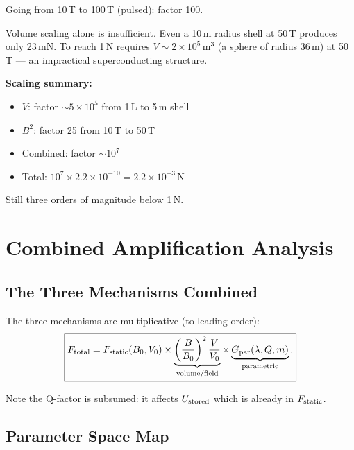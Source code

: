 \documentclass[11pt]{article}
\begin{document}
Going from 10\,T to 100\,T (pulsed): factor 100.

\begin{tcolorbox}[colback=blue!5!white, colframe=blue!50!black,
  title=Volume Scaling Verdict]
Volume scaling alone is insufficient. Even a 10\,m radius shell at 50\,T
produces only 23\,mN. To reach 1\,N requires $V \sim 2 \times 10^5$\,m$^3$
(a sphere of radius 36\,m) at 50\,T --- an impractical superconducting
structure.

\textbf{Scaling summary:}
\begin{itemize}
\item $V$: factor $\sim 5 \times 10^5$ from 1\,L to 5\,m shell
\item $B^2$: factor 25 from 10\,T to 50\,T
\item Combined: factor $\sim 10^7$
\item Total: $10^7 \times 2.2 \times 10^{-10} = 2.2 \times 10^{-3}$\,N
\end{itemize}
Still three orders of magnitude below 1\,N.
\end{tcolorbox}


\section{Combined Amplification Analysis}\label{sec:combined}

\subsection{The Three Mechanisms Combined}

The three mechanisms are multiplicative (to leading order):
\begin{equation}\label{eq:combined}
\boxed{
F_{\rm total} = F_{\rm static}(B_0, V_0)
  \times \underbrace{\left(\frac{B}{B_0}\right)^2 \frac{V}{V_0}}_{\text{volume/field}}
  \times \underbrace{G_{\rm par}(\lambda, Q, m)}_{\text{parametric}}.
}
\end{equation}

Note the Q-factor is subsumed: it affects $U_{\rm stored}$ which is
already in $F_{\rm static}$.

\subsection{Parameter Space Map}
\end{document}
